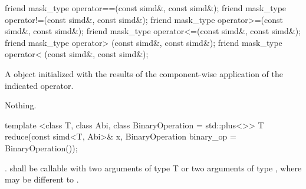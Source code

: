 \begin{itemdecl}
friend mask_type operator==(const simd&, const simd&);
friend mask_type operator!=(const simd&, const simd&);
friend mask_type operator>=(const simd&, const simd&);
friend mask_type operator<=(const simd&, const simd&);
friend mask_type operator> (const simd&, const simd&);
friend mask_type operator< (const simd&, const simd&);
\end{itemdecl}
\begin{itemdescr}
  \pnum\returns A \mask object initialized with the results of the component-wise application of the indicated operator.

  \pnum\throws Nothing.
\end{itemdescr}

\begin{itemdecl}
template <class T, class Abi, class BinaryOperation = std::plus<>>
T reduce(const simd<T, Abi>& x, BinaryOperation binary_op = BinaryOperation());
\end{itemdecl}
\begin{itemdescr}
  \pnum\returns {} \foralli.
  \pnum\requires {} shall be callable with two arguments of type \type T or two arguments of type \simd[<T, A1>], where  may be different to .
  \pnum{}
\end{itemdescr}

